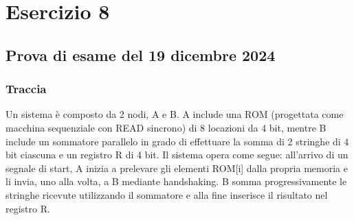 \chapter{Esercizio 8}
\section{Prova di esame del 19 dicembre 2024}
\subsection{Traccia}
 Un sistema è composto da 2 nodi, A e B. A include una ROM (progettata come macchina sequenziale con READ sincrono) di 8 locazioni da 4 bit, mentre B include un sommatore 
parallelo in grado di effettuare la somma di 2 stringhe di 4 bit ciascuna e un registro R di 4 bit. Il sistema opera come segue: all’arrivo di un segnale di start,  A inizia a prelevare gli elementi ROM[i] dalla propria memoria e li invia, uno alla volta, a B mediante handshaking. B somma progressivamente le stringhe ricevute utilizzando il sommatore e alla fine inserisce il risultato nel registro R.
